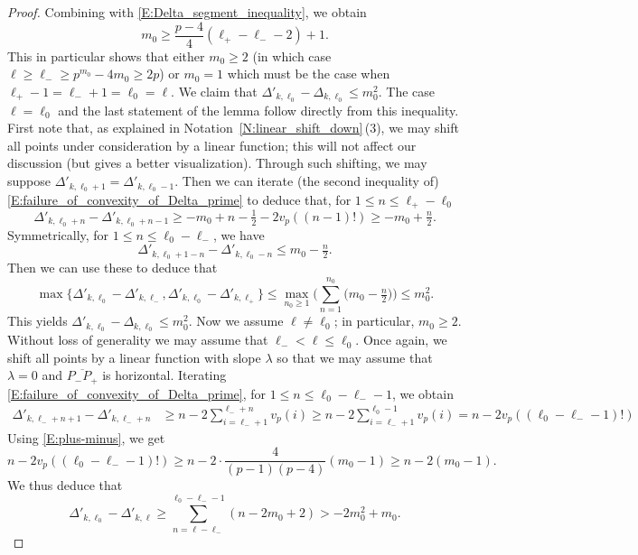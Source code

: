 \begin{proof}
    Combining with \eqref{E:Delta_segment_inequality}, we obtain
    \begin{equation}
    \label{E:plus-minus}
    m_0 \geq
    \frac{p-4}{4}(\ell_+-\ell_--2) + 1.
    \end{equation}
    This in particular shows that either $m_0 \geq 2$ (in which case $\ell \geq \ell_- \geq p^{m_0} - 4m_0\geq 2p$) or $m_0=1$ which must be the case when $\ell_+-1=\ell_-+1 = \ell_0 = \ell$.
    We claim that $\Delta'_{k, \ell_0} - \Delta_{k, \ell_0} \leq m_0^2$. The case $\ell=\ell_0$ and the last statement of the lemma follow directly from this inequality. First note that, as explained in Notation~\ref{N:linear_shift_down}\,(3), we may shift all points under consideration by a linear function; this will not affect our discussion (but gives a better visualization). Through such shifting, we may suppose $\Delta'_{k, \ell_0+1}=\Delta'_{k, \ell_0-1}$. Then we can iterate (the second inequality of) \eqref{E:failure_of_convexity_of_Delta_prime} to deduce that, for $1\leq n \leq \ell_+-\ell_0$
    \[
    \Delta'_{k, \ell_0+ n} - \Delta'_{k, \ell_0+n-1}  \geq -m_0 +n - \tfrac{1}2- 2v_p((n-1)!)\geq -m_0+\tfrac n2.
    \]
    Symmetrically, for $1\leq n \leq \ell_0-\ell_-$, we have
    $$
    \Delta'_{k, \ell_0+1-n} - \Delta'_{k, \ell_0-n} \leq m_0-\tfrac n2.
    $$
    Then we can use these to deduce that
    \[
    \max\{\Delta'_{k, \ell_0} - \Delta'_{k, \ell_-}, \Delta'_{k, \ell_0} - \Delta'_{k, \ell_+}  \}
    \leq \max_{n_0\geq 1}\Big( \sum_{n=1}^{n_0} \big(m_0-\tfrac n2\big)\Big) \leq  m_0^2.
    \]
    This yields $\Delta'_{k, \ell_0} - \Delta_{k, \ell_0} \leq m_0^2$.
    Now we assume $\ell \neq \ell_0$; in particular, $m_0 \geq 2$. Without loss of generality we may assume that $\ell_-<\ell \leq \ell_0$. Once again, we shift all points by a linear function with slope $\lambda$ so that we may assume that $\lambda = 0$ and $\overline{P_-P_+}$ is horizontal. Iterating
    \eqref{E:failure_of_convexity_of_Delta_prime}, for $1\leq n\leq \ell_0-\ell_--1$, we obtain
    \begin{align*}
    \Delta'_{k, \ell_-+ n+1} - \Delta'_{k, \ell_-+n}  &\geq n- 2\sum_{i=\ell_-+1}^{\ell_-+n}v_p(i)\geq n- 2\sum_{i=\ell_-+1}^{\ell_0-1}v_p(i)=n- 2v_p((\ell_0-\ell_--1)!)
    \end{align*}
    Using \eqref{E:plus-minus}, we get $$n- 2v_p((\ell_0-\ell_--1)!)\geq n - 2\cdot  \frac{4}{(p-1)(p-4)}(m_0-1) \geq  n-2(m_0-1).$$ We thus deduce that
    \[
    \Delta'_{k, \ell_0} - \Delta'_{k, \ell}\geq \sum_{n=\ell-\ell_-}^{\ell_0-\ell_--1}(n-2m_0+2)> - 2m_0^2 + m_0.
\]
\end{proof}
